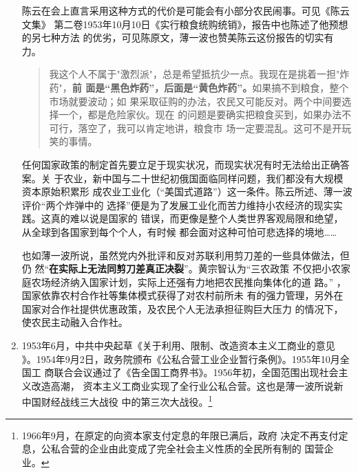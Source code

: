 \begin{enumerate}
  陈云在会上直言采用这种方式的代价是可能会有小部分农民闹事。可见《陈云文集》
  第二卷1953年10月10日《实行粮食统购统销》，报告中也陈述了他预想的另七种方法
  的优劣，可见陈原文，薄一波也赞美陈云这份报告的切实有力。
  \begin{quotation}
    我这个人不属于"激烈派"，总是希望抵抗少一点。我现在是挑着一担"炸药"，\textbf{前
      面是“黑色炸药”，后面是“黄色炸药”。}如果搞不到粮食，整个市场就要波动；如
    果采取征购的办法，农民又可能反对。两个中间要选择一个，都是危险家伙。现在
    的问题是要确实把粮食买到，如果办法不可行，落空了，我可以肯定地讲，粮食市
    场一定要混乱。这可不是开玩笑的事情。
  \end{quotation}

  任何国家政策的制定首先要立足于现实状况，而现实状况有时无法给出正确答案。关
  于农业，新中国与二十世纪初俄国面临同样问题，我们都没有大规模资本原始积累形
  成农业工业化（“美国式道路”）这一条件。陈云所述、薄一波评价“两个炸弹中的
  选择”便是为了发展工业化而苦力维持小农经济的现实实践。这真的难以说是国家的
  错误，而更像是整个人类世界客观局限和绝望，从全球到各国家到每个个人，有时候
  都会面对这种可怕可悲选择的境地……

  也如薄一波所说，虽然党内外批评和反对苏联利用剪刀差的一些具体做法，但仍
  然“\textbf{在实际上无法同剪刀差真正决裂}”。\cite[281]{boyibo}黄宗智认为“三农政策
  不仅把小农家庭农场经济纳入国家计划，实际上还强有力地把农民推向集体化的道
  路。”\cite[175]{sanjiaozhou} ，国家依靠农村合作社等集体模式获得了对农村前所未
  有的强力管理，另外在国家对合作社提供优惠政策，及农民个人无法承担征购巨大压力
  的情况下，使农民主动融入合作社。

\item 1953年6月，中共中央起草《关于利用、限制、改造资本主义工商业的意见
  》。1954年9月2日，政务院颁布《公私合营工业企业暂行条例》。1955年10月全国工
  商联合会议通过了《告全国工商界书》。1956年初，全国范围出现社会主义改造高潮，
  资本主义工商业实现了全行业公私合营。这也是薄一波所说新中国财经战线三大战役
  中的第三次大战役。\footnote{1966年9月，在原定的向资本家支付定息的年限已满后，政府
    决定不再支付定息，公私合营的企业由此变成了完全社会主义性质的全民所有制的
    国营企业。}




\end{enumerate}
